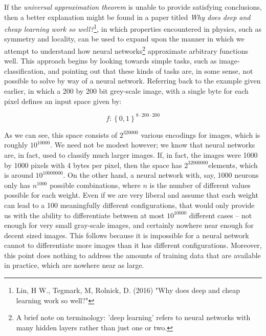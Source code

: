 \documentclass[11pt]{article}
\begin{document}
If the \textit{universal approximation theorem} is unable to provide satisfying conclusions, then a better explanation might be found in a paper titled \textit{Why does deep and cheap learning work so well?}\footnote{Lin, H W., Tegmark, M, Rolnick, D. (2016) "Why does deep and cheap learning work so well?"}, in which properties encountered in physics, such as symmetry and locality, can be used to expand upon the manner in which we attempt to understand how neural networks\footnote{A brief note on terminology: 'deep learning' refers to neural networks with many hidden layers rather than just one or two.} approximate arbitrary functions well. This approach begins by looking towards simple tasks, such as image-classification, and pointing out that these kinds of tasks are, in some sense, not possible to solve by way of a neural network. Referring back to the example given earlier, in which a 200 by 200 bit grey-scale image, with a single byte for each pixel defines an input space given by:

\begin{equation}f: \left \{ 0,1 \right \}^{8\cdot 200 \cdot 200} \nonumber\end{equation}

As we can see, this space consists of $2^{320000}$ various encodings for images, which is roughly $10^{10000}$. We need not be modest however; we know that neural networks are, in fact, used to classify much larger images. If, in fact, the images were 1000 by 1000 pixels with 4 bytes per pixel, then the space has $2^{32000000}$elements, which is around $10^{10000000}$. On the other hand, a neural network with, say, 1000 neurons only has $n^{1000}$ possible combinations, where $n$ is the number of different values possible for each weight. Even if we are very liberal and assume that each weight can lead to a 100 meaningfully different configurations, that would only provide us with the ability to differentiate between at most $10^{10000}$ different cases – not enough for very small gray-scale images, and certainly nowhere near enough for decent sized images. This follows because it is impossible for a neural network cannot to differentiate more images than it has different configurations. Moreover, this point does nothing to address the amounts of training data that are available in practice, which are nowhere near as large.
\end{document}
